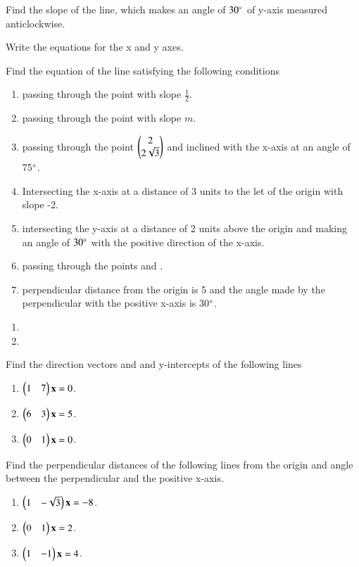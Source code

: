 \item Find the slope of the line, which makes an angle of $30\degree$ of y-axis measured anticlockwise.
\item Write the equations for the x and y axes.
\item Find the equation of the line satisfying the following conditions 
\begin{enumerate}
\item passing through  the point  with slope $\frac{1}{2}$.
\item passing through the point  with slope $m$.
\item passing through the point $\begin{pmatrix}2\\2\sqrt{3}\end{pmatrix}$ and inclined with the x-axis at an angle of 75$\degree$.
\item Intersecting the x-axis at a distance of 3 units to the let of the origin with slope -2.
\item intersecting the y-axis at a distance of 2 units above the origin and making an angle of $30\degree$ with the positive direction of the x-axis.
\item passing through the points  and .
\item perpendicular distance from the origin is 5 and the angle made by the perpendicular with the positive x-axis is 30$\degree$.
\end{enumerate}
%
\solution
\begin{enumerate}
\item 
\item 
\end{enumerate}

\item Find the direction vectors and and y-intercepts  of the following lines 
\begin{enumerate}
\item $\begin{pmatrix}1 & 7\end{pmatrix}\mathbf{x} = 0$.
\item $\begin{pmatrix}6 & 3\end{pmatrix}\mathbf{x} = 5$.
\item $\begin{pmatrix}0 & 1\end{pmatrix}\mathbf{x} = 0$.
\end{enumerate}

\item Find the perpendicular distances of the following lines from the origin and angle between the perpendicular and the positive x-axis.
\begin{enumerate}
\item $\begin{pmatrix}1 & -\sqrt{3}\end{pmatrix}\mathbf{x} = -8$.
\item $\begin{pmatrix}0 & 1\end{pmatrix}\mathbf{x} = 2$.
\item $\begin{pmatrix}1 & -1\end{pmatrix}\mathbf{x} = 4$.
\end{enumerate}

